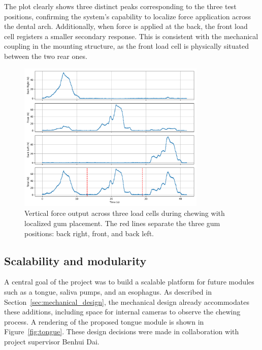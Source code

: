 The plot clearly shows three distinct peaks corresponding to the three test positions, confirming the system's capability to localize force application 
across the dental arch. Additionally, when force is applied at the back, the front load cell registers a smaller secondary response. This is consistent 
with the mechanical coupling in the mounting structure, as the front load cell is physically situated between the two rear ones.

\begin{figure}[H]
    \centering 
    \includegraphics[width=0.8\textwidth]{figures/ForceDistributionGum.png}
    \caption{Vertical force output across three load cells during chewing with localized gum placement.  
    The red lines separate the three gum positions: back right, front, and back left.}
    \label{fig:force_distribution_gum}
\end{figure}

\subsection{Scalability and modularity}
A central goal of the project was to build a scalable platform for future modules such as a tongue, saliva pumps, and an esophagus. As described in 
Section~\ref{sec:mechanical_design}, the mechanical design already accommodates these additions, including space for internal cameras to observe the 
chewing process. A rendering of the proposed tongue module is shown in Figure~\ref{fig:tongue}. These design decisions were made in collaboration with 
project supervisor Benhui Dai.

